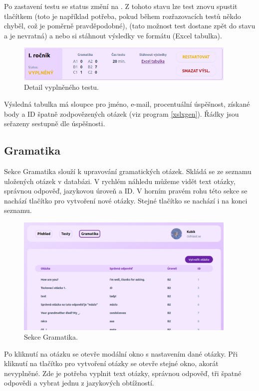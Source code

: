 Po zastavení testu se status změní na . Z tohoto stavu lze test znovu spustit tlačítkem  (toto je například potřeba, pokud během rozřazovacích testů někdo chyběl, což je poměrně pravděpodobné),  (tato možnost test dostane zpět do stavu  a je nevratná) a nebo si stáhnout výsledky ve formátu  (Excel tabulka).

\begin{figure}[H]
    \centering
    \includegraphics[width=400px]{images/01design/test-filled.png}
    \caption{Detail vyplněného testu.}
\end{figure}

Výsledná tabulka má sloupce pro jméno, e-mail, procentuální úspěšnost, získané body a ID špatně zodpovězených otázek (viz program \ref{xslxgen}). Řádky jsou seřazeny sestupně dle úspěšnosti.

\subsection{Gramatika}

Sekce Gramatika slouží k upravování gramatických otázek. Skládá se ze seznamu uložených otázek v databázi. V rychlém náhledu můžeme vidět text otázky, správnou odpověď, jazykovou úroveň a ID. V horním pravém rohu této sekce se nachází tlačítko pro vytvoření nové otázky. Stejné tlačítko se nachází i na konci seznamu.

\begin{figure}[H]
    \centering
    \includegraphics[width=400px]{images/01design/grammar.png}
    \caption{Sekce Gramatika.}
\end{figure}

Po kliknutí na otázku se otevře modální okno s nastavením dané otázky. Při kliknutí na tlačítko pro vytvoření otázky se otevře stejné okno, akorát nevyplněné. Zde je potřeba vyplnit text otázky, správnou odpověď, tři špatné odpovědi a vybrat jednu z jazykových obtížností. 

